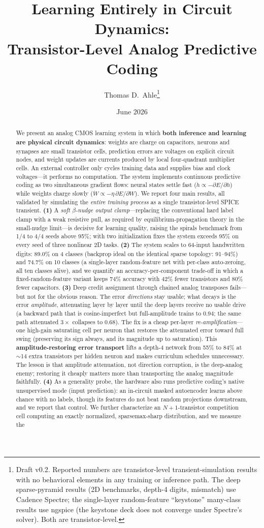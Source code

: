 \documentclass[11pt]{article}
\title{Learning Entirely in Circuit Dynamics:\\
Transistor-Level Analog Predictive Coding}
\author{Thomas D.\ Ahle\thanks{Draft v0.2. Reported numbers are transistor-level transient-simulation results with no behavioral elements in any training or inference path. The deep sparse-pyramid results (2D benchmarks, depth-4 digits, mismatch) use Cadence Spectre; the single-layer random-feature ``keystone'' many-class results use ngspice (the keystone deck does not converge under Spectre's solver). Both are transistor-level.}}
\date{June 2026}
\begin{document}
\maketitle

\begin{abstract}
We present an analog CMOS learning system in which \textbf{both inference and learning are physical circuit dynamics}: weights are charge on capacitors, neurons and synapses are small transistor cells, prediction errors are voltages on explicit circuit nodes, and weight updates are currents produced by local four-quadrant multiplier cells. An external controller only cycles training data and supplies bias and clock voltages---it performs no computation. The system implements continuous predictive coding as two simultaneous gradient flows: neural states settle fast ($\dot h \propto -\partial E/\partial h$) while weights charge slowly ($\dot W \propto -\eta\,\partial E/\partial W$). We report four main results, all validated by simulating the \emph{entire training process} as a single transistor-level SPICE transient. \textbf{(1)} A \emph{soft $\beta$-nudge output clamp}---replacing the conventional hard label clamp with a weak resistive pull, as required by equilibrium-propagation theory in the small-nudge limit---is decisive for learning quality, raising the spirals benchmark from 1/4 to 4/4 seeds above 95\%; with two initialization fixes the system exceeds 95\% on every seed of three nonlinear 2D tasks. \textbf{(2)} The system scales to 64-input handwritten digits: 89.0\% on 4 classes (backprop ideal on the identical sparse topology: 91--94\%) and 74.7\% on 10 classes (a single-layer random-feature net with per-class auto-zeroing, all ten classes alive), and we quantify an accuracy-per-component trade-off in which a fixed-random-feature variant keeps 74\% accuracy with 42\% fewer transistors and 80\% fewer capacitors. \textbf{(3)} Deep credit assignment through chained analog transposes fails---but not for the obvious reason. The error \emph{directions} stay usable; what decays is the error \emph{amplitude}, attenuating layer by layer until the deep layers receive no usable drive (a backward path that is cosine-imperfect but full-amplitude trains to 0.94; the same path attenuated $3\times$ collapses to 0.68). The fix is a cheap per-layer \emph{re-amplification}---one high-gain saturating cell per neuron that restores the attenuated error toward full swing (preserving its sign always, and its magnitude up to saturation). This \textbf{amplitude-restoring error transport} lifts a depth-4 network from 55\% to 84\% at $\sim$14 extra transistors per hidden neuron and makes curriculum schedules unnecessary. The lesson is that amplitude attenuation, not direction corruption, is the deep-analog enemy; restoring it cheaply matters more than transporting the analog magnitude faithfully. \textbf{(4)} As a generality probe, the hardware also runs predictive coding's native unsupervised mode (input prediction): an in-circuit masked autoencoder learns above chance with no labels, though its features do not beat random projections downstream, and we report that control. We further characterize an $N{+}1$-transistor competition cell computing an exactly normalized, sparsemax-sharp distribution, and we measure the 
\end{abstract}
\end{document}
